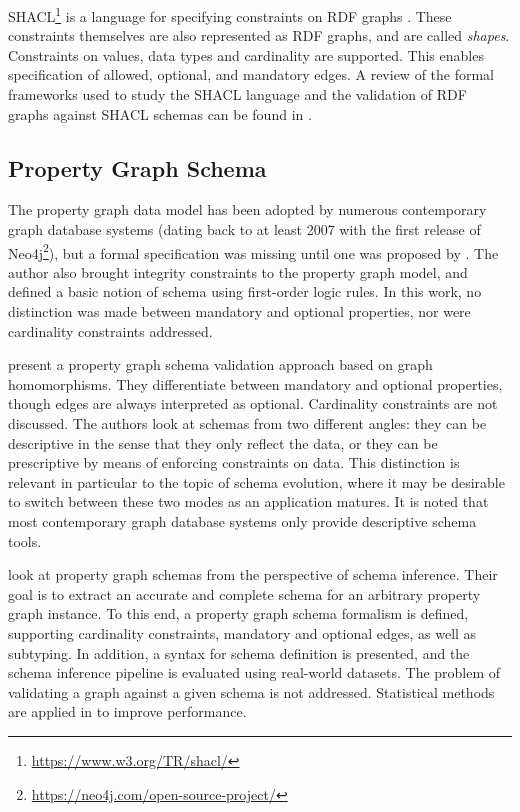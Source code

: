 \documentclass{article}
\theoremstyle{definition}
\begin{document}
SHACL\footnote{\url{https://www.w3.org/TR/shacl/}} is a language for specifying constraints on RDF graphs \citep{pan2009rdf}. These constraints themselves are also represented as RDF graphs, and are called \emph{shapes}. Constraints on values, data types and cardinality are supported. This enables specification of allowed, optional, and mandatory edges. A review of the formal frameworks used to study the SHACL language and the validation of RDF graphs against SHACL schemas can be found in \citet{pareti2022shacl}.

\subsection{Property Graph Schema}

The property graph data model has been adopted by numerous contemporary graph database systems (dating back to at least 2007 with the first release of Neo4j\footnote{\url{https://neo4j.com/open-source-project/}}), but a formal specification was missing until one was proposed by \citet{angles2018property}. The author also brought integrity constraints to the property graph model, and defined a basic notion of schema using first-order logic rules. In this work, no distinction was made between mandatory and optional properties, nor were cardinality constraints addressed.

\citet{bonifati2019schema} present a property graph schema validation approach based on graph homomorphisms. They differentiate between mandatory and optional properties, though edges are always interpreted as optional. Cardinality constraints are not discussed. The authors look at schemas from two different angles: they can be descriptive in the sense that they only reflect the data, or they can be prescriptive by means of enforcing constraints on data. This distinction is relevant in particular to the topic of schema evolution, where it may be desirable to switch between these two modes as an application matures. It is noted that most contemporary graph database systems only provide descriptive schema tools.

\citet{lbath2021inference} look at property graph schemas from the perspective of schema inference. Their goal is to extract an accurate and complete schema for an arbitrary property graph instance. To this end, a property graph schema formalism is defined, supporting cardinality constraints, mandatory and optional edges, as well as subtyping. In addition, a syntax for schema definition is presented, and the schema inference pipeline is evaluated using real-world datasets. The problem of validating a graph against a given schema is not addressed. Statistical methods are applied in \citep{bonifati2022hierarchical} to improve performance.
\end{document}
